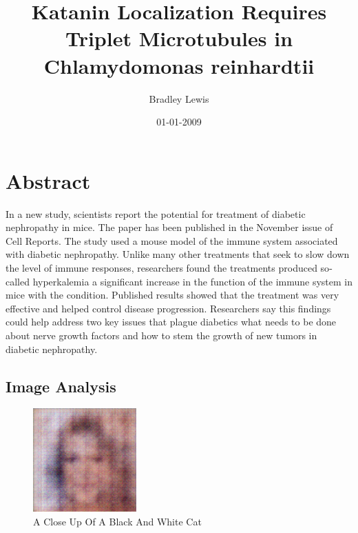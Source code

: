 \documentclass{article}%
\title{Katanin Localization Requires Triplet Microtubules in Chlamydomonas reinhardtii}%
\author{Bradley Lewis}%
\affil{Oncology Research, Pfizer Worldwide Research and Development, San Diego, California, United States of America}%
\date{01{-}01{-}2009}%
\begin{document}
%
\normalsize%
\maketitle%
\section{Abstract}%
\label{sec:Abstract}%
In a new study, scientists report the potential for treatment of diabetic nephropathy in mice.\newline%
The paper has been published in the November issue of Cell Reports.\newline%
The study used a mouse model of the immune system associated with diabetic nephropathy.\newline%
Unlike many other treatments that seek to slow down the level of immune responses, researchers found the treatments produced so{-}called hyperkalemia  a significant increase in the function of the immune system in mice with the condition.\newline%
Published results showed that the treatment was very effective and helped control disease progression.\newline%
Researchers say this findings could help address two key issues that plague diabetics  what needs to be done about nerve growth factors and how to stem the growth of new tumors in diabetic nephropathy.

%
\subsection{Image Analysis}%
\label{subsec:ImageAnalysis}%


\begin{figure}[h!]%
\centering%
\includegraphics[width=150px]{500_fake_images/samples_5_231.png}%
\caption{A Close Up Of A Black And White Cat}%
\end{figure}

%
\end{document}
